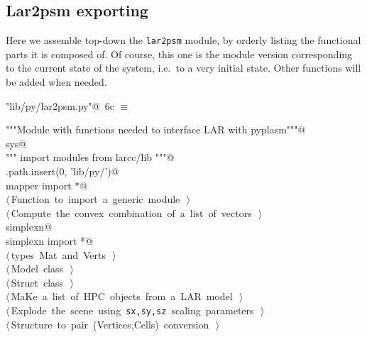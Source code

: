 \documentclass[11pt,oneside]{article}	%
\begin{document}
\subsection{Lar2psm exporting}
\label{sec:lar2psm}
Here we assemble top-down the \texttt{lar2psm} module, by orderly listing the functional parts it is composed of. Of course, this one is the module version corresponding to the current state of the system, i.e.~to a very initial state. Other functions will be added when needed.
\begin{flushleft} \small \label{scrap16}
\protect{}\verb@"lib/py/lar2psm.py"@\nobreak\ {\footnotesize 6c }$\equiv$
\vspace{-1ex}
\begin{list}{}{} \item
\mbox{}\verb@"""Module with functions needed to interface LAR with pyplasm"""@\\
\mbox{}\verb@import sys@\\
\mbox{}\verb@""" import modules from larcc/lib """@\\
\mbox{}\verb@sys.path.insert(0, 'lib/py/')@\\
\mbox{}\verb@from mapper import *@\\
\mbox{}\verb@@\hbox{$\langle\,$Function to import a generic module\nobreak\ {\footnotesize {}}$\,\rangle$}\verb@@\\
\mbox{}\verb@@\hbox{$\langle\,$Compute the convex combination of a list of vectors\nobreak\ {\footnotesize {}}$\,\rangle$}\verb@@\\
\mbox{}\verb@import simplexn@\\
\mbox{}\verb@from simplexn import *@\\
\mbox{}\verb@@\hbox{$\langle\,$types Mat and Verts\nobreak\ {\footnotesize {}}$\,\rangle$}\verb@@\\
\mbox{}\verb@@\hbox{$\langle\,$Model class\nobreak\ {\footnotesize {}}$\,\rangle$}\verb@@\\
\mbox{}\verb@@\hbox{$\langle\,$Struct class\nobreak\ {\footnotesize {}}$\,\rangle$}\verb@@\\
\mbox{}\verb@@\hbox{$\langle\,$MaKe a list of HPC objects from a LAR model\nobreak\ {\footnotesize {}}$\,\rangle$}\verb@@\\
\mbox{}\verb@@\hbox{$\langle\,$Explode the scene using \texttt{sx,sy,sz} scaling parameters\nobreak\ {\footnotesize {}}$\,\rangle$}\verb@@\\
\mbox{}\verb@@\hbox{$\langle\,$Structure to pair (Vertices,Cells) conversion\nobreak\ {\footnotesize {}}$\,\rangle$}\verb@@\\
\mbox{}\verb@@{\NWsep}
\end{list}
\vspace{-2ex}
\end{flushleft}
\end{document}
